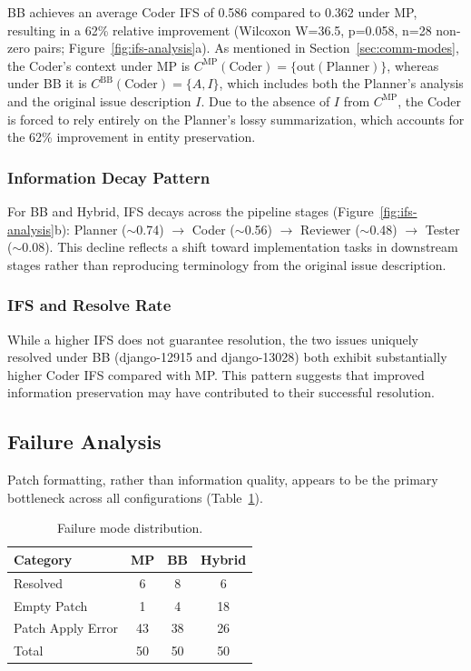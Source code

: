 \documentclass{ieeeaccess}
\begin{document}
BB achieves an average Coder IFS of 0.586 compared to 0.362 under MP, resulting in a 62\% relative improvement (Wilcoxon W=36.5, p=0.058, n=28 non-zero pairs; Figure~\ref{fig:ifs-analysis}a). As mentioned in Section~\ref{sec:comm-modes}, the Coder's context under MP is $C^{\text{MP}}(\text{Coder}) = \{\text{out}(\text{Planner})\}$, whereas under BB it is $C^{\text{BB}}(\text{Coder}) = \{A, I\}$, which includes both the Planner's analysis and the original issue description $I$. Due to the absence of $I$ from $C^{\text{MP}}$, the Coder is forced to rely entirely on the Planner's lossy summarization, which accounts for the 62\% improvement in entity preservation.

\subsubsection{Information Decay Pattern}

For BB and Hybrid, IFS decays across the pipeline stages (Figure~\ref{fig:ifs-analysis}b): Planner ($\sim$0.74) $\rightarrow$ Coder ($\sim$0.56) $\rightarrow$ Reviewer ($\sim$0.48) $\rightarrow$ Tester ($\sim$0.08). This decline reflects a shift toward implementation tasks in downstream stages rather than reproducing terminology from the original issue description.

\subsubsection{IFS and Resolve Rate}

While a higher IFS does not guarantee resolution, the two issues uniquely resolved under BB (django-12915 and django-13028) both exhibit substantially higher Coder IFS compared with MP. This pattern suggests that improved information preservation may have contributed to their successful resolution.

\subsection{Failure Analysis}

Patch formatting, rather than information quality, appears to be the primary bottleneck across all configurations (Table~\ref{tab:failures}).

\begin{table}[!ht]
\centering
\caption{Failure mode distribution.}
\label{tab:failures}
\begin{tabular}{lccc}
\toprule
\textbf{Category} & \textbf{MP} & \textbf{BB} & \textbf{Hybrid} \\
\midrule
Resolved & 6 & 8 & 6 \\
Empty Patch & 1 & 4 & 18 \\
Patch Apply Error & 43 & 38 & 26 \\
\midrule
Total & 50 & 50 & 50 \\
\bottomrule
\end{tabular}
\end{table}
\end{document}
